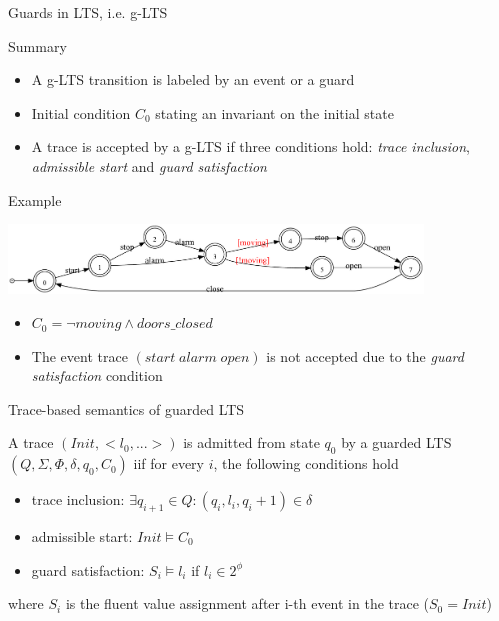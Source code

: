 \begin{frame}{Guards in LTS, i.e. g-LTS}
  \begin{block}{Summary}
	  \begin{itemize}
		  \item A g-LTS transition is labeled by an event or a guard
		  \item Initial condition $C_0$ stating an invariant on the initial state
		  \item A trace is accepted by a g-LTS if three conditions hold: \emph{trace inclusion}, \emph{admissible start} and \emph{guard satisfaction}
	  \end{itemize}
  \end{block}
  \begin{block}{Example}
	  \begin{center} \includegraphics[width=11cm]{images/Train_guarded_LTS.pdf} \end{center}
	  \vspace{-0.5cm}
	  \begin{itemize}
		  \item $C_0 = \neg moving \wedge doors\_closed$
		  \item The event trace $(start\;alarm\;open)$ is not accepted due to the \emph{guard satisfaction} condition
	  \end{itemize}
  \end{block}
\end{frame}

\begin{frame}{Trace-based semantics of guarded LTS}

  A trace $(Init, <l_0,...>)$ is admitted from state $q_0$ by a guarded LTS $(Q,\Sigma,\Phi,\delta,q_0,C_0)$ iif 
  for every $i$, the following conditions hold
  
  \begin{itemize}
    \item trace inclusion:    $\exists q_{i+1} \in Q: (q_i,l_i,q_i+1) \in \delta$
    \item admissible start:   $Init \models C_0$
    \item guard satisfaction: $S_i \models l_i$ if $l_i \in 2^\phi$
  \end{itemize}
  
  where $S_i$ is the fluent value assignment after i-th event in the trace ($S_0 = Init$)

\end{frame}

